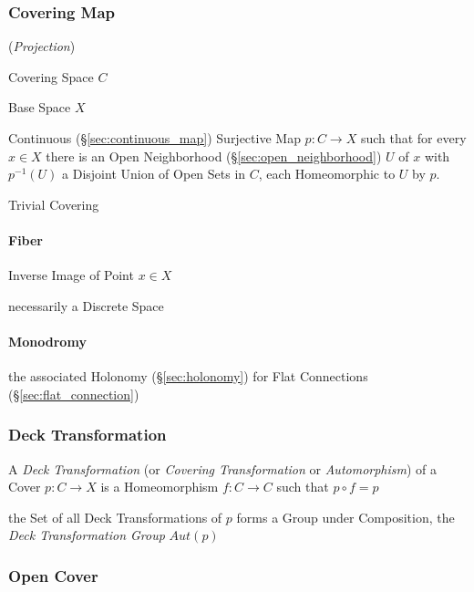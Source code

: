 \subsubsection{Covering Map}\label{sec:covering_map}

(\emph{Projection})

Covering Space $C$

Base Space $X$

Continuous (\S\ref{sec:continuous_map}) Surjective Map $p : C
\rightarrow X$ such that for every $x \in X$ there is an Open
Neighborhood (\S\ref{sec:open_neighborhood}) $U$ of $x$ with
$p^{-1}(U)$ a Disjoint Union of Open Sets in $C$, each Homeomorphic to
$U$ by $p$.

Trivial Covering



\paragraph{Fiber}\label{sec:point_fiber}\hfill

Inverse Image of Point $x \in X$

necessarily a Discrete Space



\paragraph{Monodromy}\label{sec:monodromy}\hfill

\fist the associated Holonomy (\S\ref{sec:holonomy}) for Flat Connections
(\S\ref{sec:flat_connection})



\subsubsection{Deck Transformation}\label{sec:deck_transformation}

A \emph{Deck Transformation} (or \emph{Covering Transformation} or
\emph{Automorphism}) of a Cover $p : C \rightarrow X$ is a
Homeomorphism $f : C \rightarrow C$ such that $p \circ f = p$

the Set of all Deck Transformations of $p$ forms a Group under
Composition, the \emph{Deck Transformation Group} $Aut(p)$



\subsubsection{Open Cover}\label{sec:open_cover}

